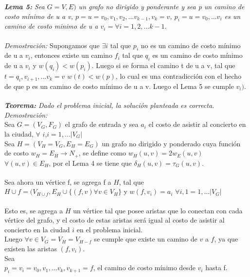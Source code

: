 \documentclass[12pt]{article}
\begin{document}
\textit{\textbf{Lema 5:} Sea $G = V,E)$ un grafo no dirigido y ponderante y sea p un camino de costo m\'inimo de u a v, $p= {u=v_0, v_1, v_2,...v_{k-1}, v_k= v}$,
$p_i = {u = v_0, ...v_i}$ es un camino de costo m\/inimo de u a $v_i = \forall i= 1,2,...k-1$}.\\
\\
\textit{Demostraci\'on:} Supongamos que $\exists i$ tal que $p_i$ no es un camino de costo m\'inimo de u a $v_i$, entonces existe un camino $f_i$ tal que  $q_i$  es un camino de costo m\'inimo de u a $v_i$ y $w(q_i) < w(p_i)$. Luego si se forma el camino t de u a v, tal que $t = {q_i, v_{i+1},... v_k = v}$
$w(t) < w(p)$, lo cual es una contradicci\'on con el hecho de que p es un camino de costo m\'inimo de u a v. Luego el Lema 5 se cumple $v_i)$.\\
\\

\textit{\textbf{Teorema:} Dado el problema inicial, la soluci\'on planteada es correcta.}\\
 
\textit{Demostraci\'on:}\\
Sea $G=(V_G,F_G)$ el grafo de entrada y sea $a_i$ el costo de asistir al concierto en la ciudad, 
$\forall$ $i$,$i = 1,...|V_G|$\\
Sea $H=(V_H=V_G,E_H=E_G)$ un grafo no dirigido y ponderado cuya funci\'on de costo $w_H=E_H \rightarrow N_+$, se define como 
$w_H (u,v) = 2w_E(u,v)$ $\forall (u,v) \in E_H$,
por el Lema 4 se tiene que $\delta_H (u,v) = \tau_G(u,v)$.\\
\\
Sea ahora un v\'ertice f, se agrega f a $H$, tal que $H \cup f = (V_{H\cup f}, E_H \cup \{(f,v) \forall v \in V_H\}$ y 
$w(f,v_i) = a_i$  $\forall i,1 = 1,...|V_G|$\\
\\
Esto es, se agrega a $H$ un v\'ertice tal que posee aristas que lo  conectan con cada v\'ertice del grafo, y el costo de estas aristas ser\'a igual al costo de asistir al concierto en la ciudad $i$ en el problema inicial.\\

Luego $\forall v \in V_G = V_H = V_{H-{f}}$ se cumple que existe un camino de $v$ a $f$, ya que existen las aristas $(f,v_i)$.\\

Sea \\
$p_i= {v_i = v_0, v_1,...v_k, v_{k+1} = f}$, el camino de costo m\'inimo desde $v_i$  hasta f.\\
\end{document}
